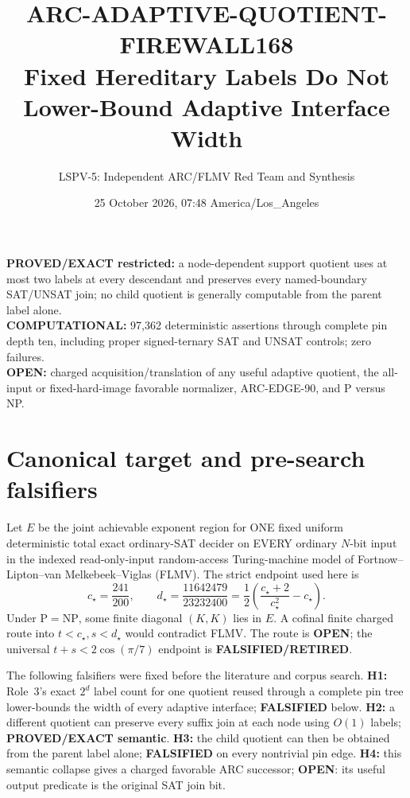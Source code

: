 \documentclass[11pt]{article}
\title{ARC-ADAPTIVE-QUOTIENT-FIREWALL168\\
\large Fixed Hereditary Labels Do Not Lower-Bound Adaptive Interface Width}
\author{LSPV-5: Independent ARC/FLMV Red Team and Synthesis}
\date{25 October 2026, 07:48 America/Los\_Angeles}
\newcommand{\OPEN}{\textbf{OPEN}}
\begin{document}
\maketitle

\begin{center}
\textbf{PROVED/EXACT restricted:} a node-dependent support quotient uses at most two labels at every descendant and preserves every named-boundary SAT/UNSAT join; no child quotient is generally computable from the parent label alone.\\
\textbf{COMPUTATIONAL:} 97,362 deterministic assertions through complete pin depth ten, including proper signed-ternary SAT and UNSAT controls; zero failures.\\
\textbf{OPEN:} charged acquisition/translation of any useful adaptive quotient, the all-input or fixed-hard-image favorable normalizer, ARC-EDGE-90, and P versus NP.
\end{center}

\section{Canonical target and pre-search falsifiers}
Let $E$ be the joint achievable exponent region for ONE fixed uniform
deterministic total exact ordinary-SAT decider on EVERY ordinary $N$-bit
input in the indexed read-only-input random-access Turing-machine model of
Fortnow--Lipton--van Melkebeek--Viglas (FLMV).  The strict endpoint used here is
\[
 c_\star=\frac{241}{200},\qquad
 d_\star=\frac{11642479}{23232400}
 =\frac12\left(\frac{c_\star+2}{c_\star^2}-c_\star\right).
\]
Under $\mathrm P=\mathrm{NP}$, some finite diagonal $(K,K)$ lies in $E$.
A cofinal finite charged route into $t<c_\star,s<d_\star$ would contradict
FLMV.  The route is \OPEN; the universal
$t+s<2\cos(\pi/7)$ endpoint is \textbf{FALSIFIED/RETIRED}.

The following falsifiers were fixed before the literature and corpus search.
\textbf{H1:} Role~3's exact $2^d$ label count for one quotient reused through a
complete pin tree lower-bounds the width of every adaptive interface;
\textbf{FALSIFIED} below.  \textbf{H2:} a different quotient can preserve every
suffix join at each node using $O(1)$ labels; \textbf{PROVED/EXACT semantic}.
\textbf{H3:} the child quotient can then be obtained from the parent label
alone; \textbf{FALSIFIED} on every nontrivial pin edge.  \textbf{H4:} this
semantic collapse gives a charged favorable ARC successor;
\textbf{OPEN}: its useful output predicate is the original SAT join bit.
\end{document}
